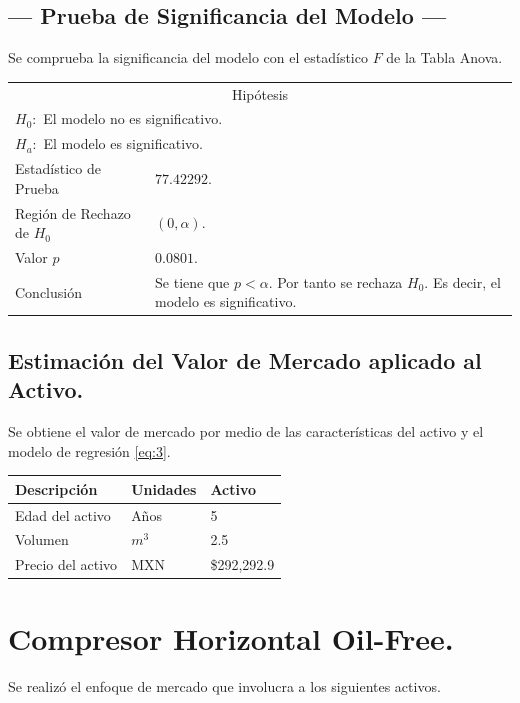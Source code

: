 \subsection{\centering --- Prueba de Significancia del Modelo ---} %
Se comprueba la significancia del modelo con el estadístico \(F\) de la Tabla Anova.
\begin{center}
  \begin{tabular}{|l|p{6cm}|}
    \cline{1-2}
    \multicolumn{2}{|c|}{Hipótesis}\\ \cline{1-2}
    \multicolumn{2}{|l|}{\(H_0:\) El modelo no es significativo.} \\ 
    \multicolumn{2}{|l|}{\(H_a:\) El modelo es significativo.} \\ \cline{1-2}
    Estadístico de Prueba & \(77.42292\).\\ \cline{1-2} 
		Región de Rechazo de \(H_0\) & \((0, \alpha )\).\\ \cline{1-2} 
    Valor \(p\) & \(0.0801\).\\ \cline{1-2} 
    Conclusión & Se tiene que \(p<\alpha\). \newline 
		Por tanto se rechaza \(H_0\). \newline 
		Es decir, el modelo es significativo.\\ \cline{1-2} 
  \end{tabular}
\end{center} 

\subsection{\centering Estimación del Valor de Mercado aplicado al Activo.} %
Se obtiene el valor de mercado por medio de las características del activo y el modelo de regresión \eqref{eq:3}.
\begin{center}
  \begin{tabular}{|l|l|l|}
    \hline 
		Descripción   & Unidades  & Activo \\ \hline 
    Edad del activo    & Años      & 5      \\ \hline 
		Volumen  & \(m ^ 3\) & 2.5   \\ \hline 
		Precio del activo   & MXN       & \$292,292.9   \\ \hline 
  \end{tabular}
\end{center} 


\section{Compresor Horizontal Oil-Free.} %
Se realizó el enfoque de mercado que involucra a los siguientes activos.

